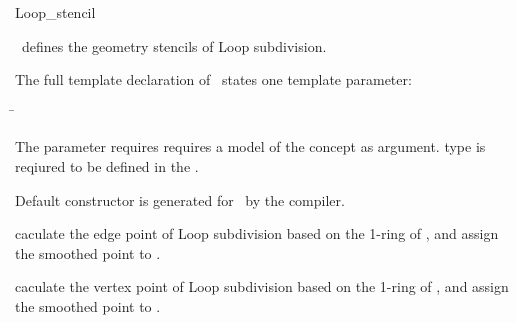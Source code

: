 \ccRefPageEnd


\begin{ccRefClass}{Loop_stencil}

\ccDefinition

\ccClassTemplateName\ defines the 
geometry stencils of Loop subdivision. 


\ccParameters

The full template declaration of \ccClassTemplateName\ states one
template parameter:

\begin{tabbing}
 \=\\
\end{tabbing}
   
The  parameter requires requires a model of 
the  concept as argument.  
type is reqiured to be defined in the .

\ccCreation

Default constructor is generated for \ccClassTemplateName\ by the compiler.

\ccThree{}{}{}

{caculate the edge point of Loop subdivision based on the 1-ring
of , and assign the smoothed point to .}

{caculate the vertex point of Loop subdivision based on the 
1-ring of , and assign the smoothed point to .}


\ccSeeAlso

\\

\end{ccRefClass}

\ccRefPageEnd


